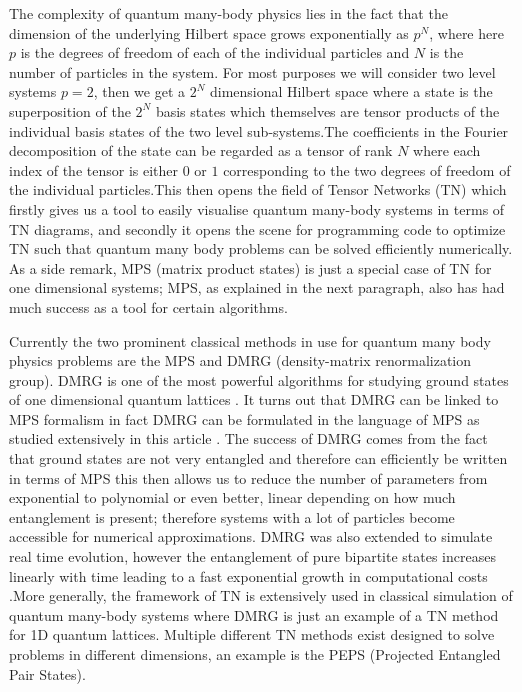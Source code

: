 \documentclass{physics_article}
\begin{document}
	The complexity of quantum many-body physics lies in the fact that the dimension of the underlying Hilbert space grows exponentially as $p^N$, where here $p$ is the degrees of freedom of each of the individual particles and $N$ is the number of particles in the system. For most purposes we will consider two level systems $p = 2$, then we get a $2^N$ dimensional Hilbert space where a state is the superposition of the $2^N$ basis states which themselves are tensor products of the individual basis states of the two level sub-systems.The coefficients in the Fourier decomposition of the state can be regarded as a tensor of rank $N$ where each index of the tensor is either $0$ or $1$ corresponding to the two degrees of freedom of the individual particles.This then opens the field of Tensor Networks (TN) \cite{orus_2014} which firstly gives us a tool to easily visualise quantum many-body systems in terms of TN diagrams, and secondly it opens the scene for programming code to optimize TN such that quantum many body problems can be solved efficiently numerically. As a side remark, MPS (matrix product states) is just a special case of TN for one dimensional systems; MPS, as explained in the next paragraph, also has had much success as a tool for certain algorithms.

	Currently the two prominent classical methods in use for quantum many body physics problems are the MPS and DMRG (density-matrix renormalization group). DMRG is one of the most powerful algorithms for studying ground states of one dimensional quantum lattices \cite{schollwock_2005,hallberg_2006}. It turns out that DMRG can be linked to MPS formalism \cite{https://doi.org/10.48550/arxiv.quant-ph/0608197} in fact DMRG can be formulated in the language of MPS as studied extensively in this article \cite{schollwock_2011}. The success of DMRG comes from the fact that ground states are not very entangled and therefore can efficiently be written in terms of MPS \cite{10.21468/SciPostPhysLectNotes.5} this then allows us to reduce the number of parameters from exponential to polynomial or even better, linear depending on how much entanglement is present; therefore systems with a lot of particles become accessible for numerical approximations. DMRG was also extended to simulate real time evolution, however the entanglement of pure bipartite states increases linearly with time leading to a fast exponential growth in computational costs \cite{10.21468/SciPostPhysLectNotes.5}.More generally, the framework of TN is extensively used in classical simulation of quantum many-body systems where DMRG is just an example of a TN method for 1D quantum lattices. Multiple different TN methods exist designed to solve problems in different dimensions, an example is the PEPS (Projected Entangled Pair States)\cite{orus_2014}. 
\end{document}
